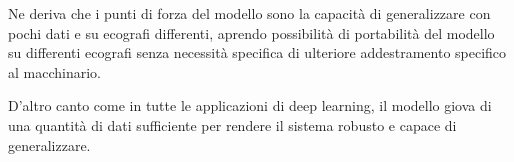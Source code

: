 %
%

%
%
%

Ne deriva che i punti di forza del modello sono la capacità di generalizzare
con pochi dati e su ecografi differenti, aprendo possibilità di portabilità del
modello su differenti ecografi senza necessit\`a specifica di ulteriore
addestramento specifico al macchinario.

D'altro canto come in tutte le applicazioni di deep learning, il modello
giova di una quantità di dati sufficiente per rendere il sistema robusto e
capace di generalizzare.
